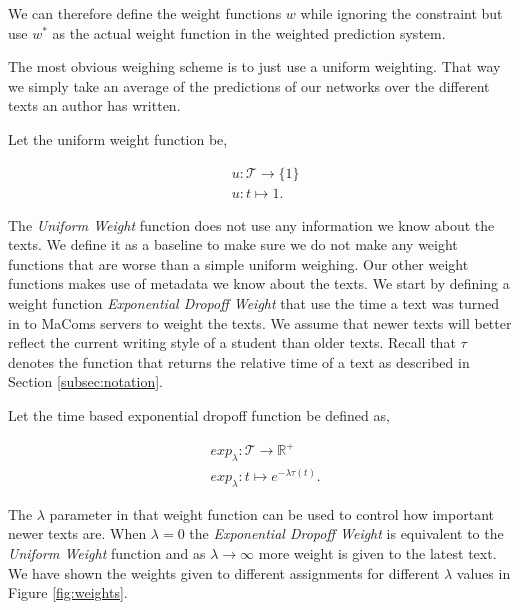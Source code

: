 We can therefore define the weight functions $w$ while ignoring the constraint
but use $w^*$ as the actual weight function in the weighted prediction system.

The most obvious weighing scheme is to just use a uniform weighting. That way
we simply take an average of the predictions of our networks over the different
texts an author has written.

\begin{definition}
    \label{def:uniform_weight}

    Let the uniform weight function be,

    \begin{align}
        &u \colon \mathcal{T} \rightarrow \{ 1 \} \\
        &u \colon t \mapsto 1.
    \end{align}

\end{definition}

The \textit{Uniform Weight} function does not use any information we know about
the texts. We define it as a baseline to make sure we do not make any weight
functions that are worse than a simple uniform weighing. Our other weight
functions makes use of metadata we know about the texts. We start by defining a
weight function \textit{Exponential Dropoff Weight} that use the time a text was
turned in to MaComs servers to weight the texts. We assume that newer texts will
better reflect the current writing style of a student than older texts. Recall
that $\tau$ denotes the function that returns the relative time of a text as
described in Section \ref{subsec:notation}.

\begin{definition}
    \label{def:exponential_dropoff_weight}

    Let the time based exponential dropoff function be defined as,

    \begin{align}
        &exp_\lambda \colon \mathcal{T} \rightarrow \mathbb{R}^+ \\
        &exp_\lambda \colon t \mapsto e^{-\lambda \tau(t)}.
    \end{align}

\end{definition}

The $\lambda$ parameter in that weight function can be used to control how
important newer texts are. When $\lambda = 0$ the \textit{Exponential Dropoff
Weight} is equivalent to the \textit{Uniform Weight} function and as $\lambda
\rightarrow \infty$ more weight is given to the latest text. We have shown the
weights given to different assignments for different $\lambda$ values in Figure
\ref{fig:weights}.

